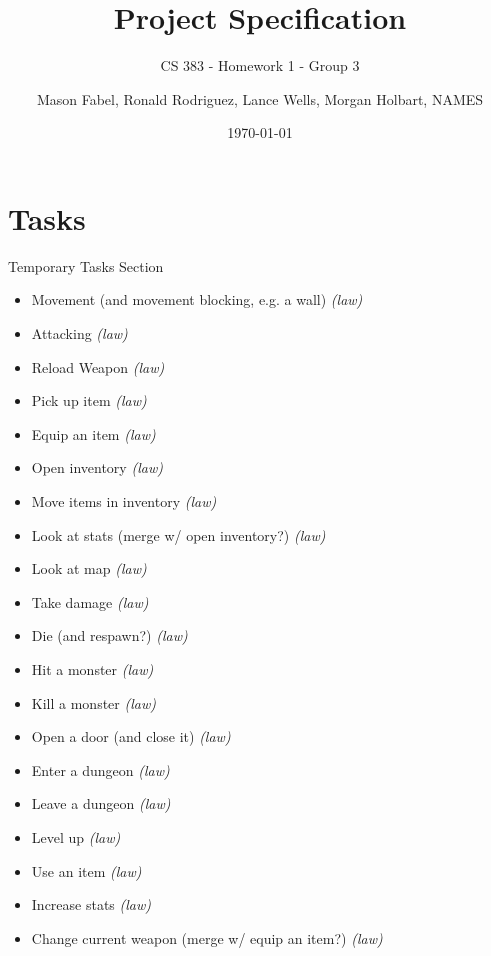 \documentclass[12pt]{report}
\title{Project Specification}
\subtitle{CS 383 - Homework 1 - Group 3}
\author{Mason Fabel, Ronald Rodriguez, Lance Wells, Morgan Holbart, NAMES} %
\date{\today}
\begin{document}
\maketitle


\chapter{Tasks}

\begin{section}{Temporary Tasks Section}

\begin{itemize}
\item	Movement (and movement blocking, e.g. a wall) \textit{(law)} %
\item	Attacking \textit{(law)} %
\item	Reload Weapon \textit{(law)} %
\item	Pick up item \textit{(law)} %
\item	Equip an item \textit{(law)} %
\item	Open inventory \textit{(law)} %
\item	Move items in inventory \textit{(law)} %
\item	Look at stats (merge w/ open inventory?) \textit{(law)} %
\item	Look at map \textit{(law)} %
\item	Take damage \textit{(law)} %
\item	Die (and respawn?) \textit{(law)}
\item	Hit a monster \textit{(law)} %
\item	Kill a monster \textit{(law)} %
\item	Open a door (and close it) \textit{(law)} %
\item	Enter a dungeon \textit{(law)} %
\item	Leave a dungeon \textit{(law)} %
\item	Level up \textit{(law)} %
\item	Use an item \textit{(law)}
\item	Increase stats \textit{(law)} %
\item	Change current weapon (merge w/ equip an item?) \textit{(law)}

\end{itemize}
\end{section}
\end{document}
